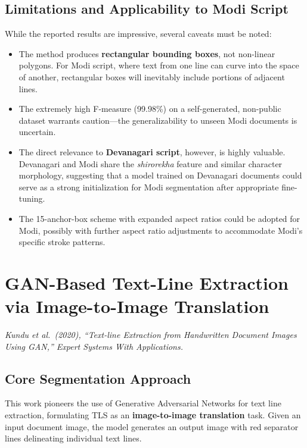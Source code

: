 \documentclass[11pt, a4paper]{article}
\begin{document}
\subsection{Limitations and Applicability to Modi Script}

While the reported results are impressive, several caveats must be noted:

\begin{itemize}[leftmargin=1.5em]
    \item The method produces \textbf{rectangular bounding boxes}, not non-linear polygons. For Modi script, where text from one line can curve into the space of another, rectangular boxes will inevitably include portions of adjacent lines.
    \item The extremely high F-measure (99.98\%) on a self-generated, non-public dataset warrants caution---the generalizability to unseen Modi documents is uncertain.
    \item The direct relevance to \textbf{Devanagari script}, however, is highly valuable. Devanagari and Modi share the \textit{shirorekha} feature and similar character morphology, suggesting that a model trained on Devanagari documents could serve as a strong initialization for Modi segmentation after appropriate fine-tuning.
    \item The 15-anchor-box scheme with expanded aspect ratios could be adopted for Modi, possibly with further aspect ratio adjustments to accommodate Modi's specific stroke patterns.
\end{itemize}


\section{GAN-Based Text-Line Extraction via Image-to-Image Translation}
\label{sec:gan_extraction}

\noindent\textit{Kundu et al.\ (2020), ``Text-line Extraction from Handwritten Document Images Using GAN,'' Expert Systems With Applications.}

\subsection{Core Segmentation Approach}

This work pioneers the use of Generative Adversarial Networks for text line extraction, formulating TLS as an \textbf{image-to-image translation} task. Given an input document image, the model generates an output image with red separator lines delineating individual text lines.
\end{document}
